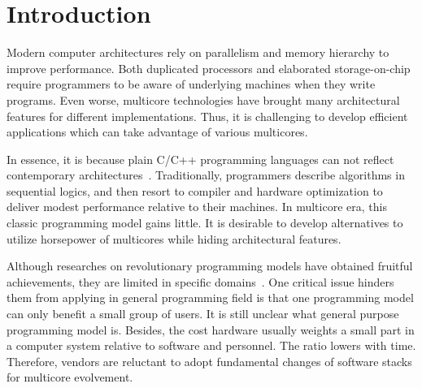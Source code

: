 \section{Introduction}\label{sec:Intro}
Modern computer architectures rely on parallelism and memory
hierarchy to improve performance. Both duplicated processors and
elaborated storage-on-chip require programmers to be aware of underlying
machines when they write programs. Even worse,
multicore technologies have brought many architectural features for
different implementations. Thus, it is challenging to develop
efficient applications which can take advantage of various multicores.

In essence, it is because plain C/C++ programming languages
can not reflect contemporary architectures~\cite{cml}. Traditionally, programmers
describe algorithms in sequential logics, and then resort to  compiler
and hardware optimization to deliver modest performance relative to
their machines. In multicore era, this classic programming model gains
little. It is desirable to develop alternatives to utilize horsepower
of multicores while hiding architectural features.

Although researches on revolutionary programming models have obtained
fruitful achievements, they are limited in specific
domains~\cite{gmapreduce, erlang, haskell}.
One critical issue hinders them from applying in general programming
field is that one programming model can only
benefit a small group of users. It is still unclear what
general purpose programming model is. Besides, the cost hardware usually weights
a small part in a computer system relative to software and
personnel. The ratio lowers with time. Therefore, vendors are
reluctant to adopt fundamental changes of software stacks for
multicore evolvement.


